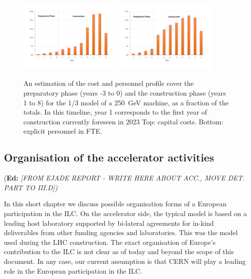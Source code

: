 \documentclass[%
 reprint,
 amsmath,amssymb,
 aps,
]{revtex4-1}
\newif\ifEdNotes \EdNotestrue
\newcommand{\doednote}[1]{{\color{red}(\textbf{Ed:} \textit{#1)}}}
\newcommand{\ednote}[1]{\ifEdNotes 
  \doednote{#1} 
\fi}
\begin{document}
\begin{figure}[htbp]
\includegraphics[width=0.45\textwidth]{figures/profile-250GeV-MEUR-norm.pdf}
\includegraphics[width=0.45\textwidth]{figures/profile-250GeV-FTE-norm.pdf}
\caption{\label{fig:costprofile:costprofile} An estimation of the cost and personnel profile cover the preparatory phase (years -3 to 0) 
and the construction phase (years 1 to 8) for the 1/3 model of a 250~GeV machine, as a fraction of the
totals. In this timeline, 
year 1 corresponds to the first year of construction currently foreseen in 2023 
Top: capital costs. Bottom: explicit personnel in FTE.
}
\end{figure}


\subsection{\label{sec:acc-org}Organisation of the accelerator activities}
\ednote{[FROM EJADE REPORT - WRITE HERE ABOUT ACC.,  MOVE DET. PART TO III.D]}
In this short chapter we discuss possible organisation forms of a European 
participation in the ILC. 
On the accelerator side, the typical model is based on a leading host laboratory supported by 
bi-lateral agreements for in-kind deliverables from other funding agencies and 
laboratories. This was the model used during the LHC construction. 
The exact organisation of Europe's contribution to the ILC is not clear as of today 
and beyond the scope of this document. In any case, our current assumption is that 
CERN will play a leading role in the European participation in the ILC.
\end{document}
